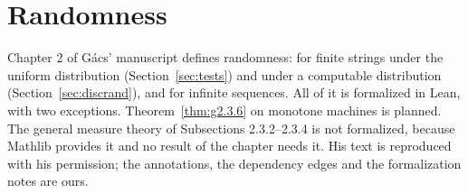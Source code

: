 %
%

\chapter{Randomness}

Chapter 2 of G\'acs' manuscript defines randomness: for finite strings under the uniform
distribution (Section~\ref{sec:tests}) and under a computable distribution
(Section~\ref{sec:discrand}), and for infinite sequences. All of it is formalized in Lean,
with two exceptions. Theorem~\ref{thm:g2.3.6} on monotone machines is planned. The general
measure theory of Subsections 2.3.2--2.3.4 is not formalized, because Mathlib provides it
and no result of the chapter needs it. His text is reproduced with his permission; the
annotations, the dependency edges and the formalization notes are ours.

